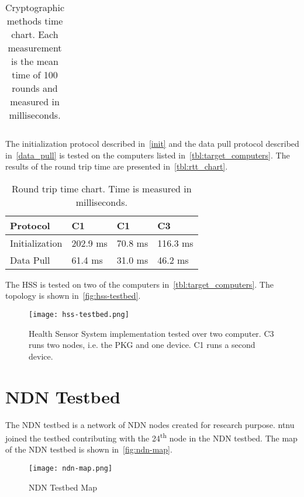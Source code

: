 \begin{table}[h]
\begin{tabular}[c]{lllll}
  \end{tabular}
  \caption[Time chart of cryptographic computations]{Cryptographic methods time chart. Each measurement is the mean time of 100 rounds and measured in milliseconds. }
  \label{tbl:time_chart}
\end{table}


The initialization protocol described in~\autoref{init} and the data pull protocol described in~\autoref{data_pull} is tested on the computers listed in~\autoref{tbl:target_computers}.
The results of the round trip time are presented in~\autoref{tbl:rtt_chart}.
\begin{table}[h]
  \begin{tabular}[c]{p{}p{}p{}p{}}
  Protocol                                & C1            & C1            & C3            \\ \hline
  Initialization                          & 202.9 ms      & 70.8 ms       & 116.3 ms     \\ %
  Data Pull                               & 61.4 ms       & 31.0 ms       & 46.2 ms     \\ %
  \end{tabular}
  \caption[Round trip time of protocols]{Round trip time chart. Time is measured in milliseconds.}
  \label{tbl:rtt_chart}
\end{table}

The \gls{HSS} is tested on two of the computers in~\autoref{tbl:target_computers}.
The topology is shown in~\autoref{fig:hss-testbed}.
\begin{figure}[ht]
  \centering
  \texttt{[image: hss-testbed.png]}
  \caption[HSS testing - computer topology]{Health Sensor System implementation tested over two computer. 
  C3 runs two nodes, i.e. the PKG and one device. 
  C1 runs a second device.}
  \label{fig:hss-testbed}
\end{figure}

\section{NDN Testbed}
The \gls{NDN} testbed is a network of \gls{NDN} nodes created for research purpose. 
\gls{ntnu} joined the testbed contributing with the 24\textsuperscript{th} node in the NDN testbed.
The map of the NDN testbed is shown in~\autoref{fig:ndn-map}.

\begin{figure}[ht]
  \centering
  \texttt{[image: ndn-map.png]}
  \caption[NDN Testbed map]{NDN Testbed Map}
  \label{fig:ndn-map}
\end{figure}
